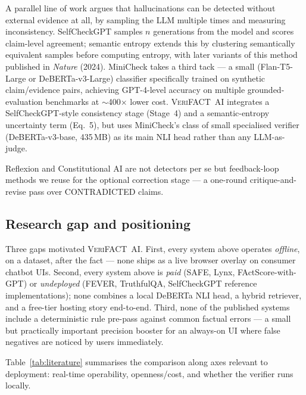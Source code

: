 \documentclass[12pt, a4paper, oneside]{report}
\newcommand{\verifact}{\textsc{VeriFACT~AI}}
\begin{document}
A parallel line of work argues that hallucinations can be detected without external evidence at all, by sampling the LLM multiple times and measuring inconsistency. SelfCheckGPT \cite{manakul2023selfcheck} samples $n$ generations from the model and scores claim-level agreement; semantic entropy \cite{kuhn2024entropy} extends this by clustering semantically equivalent samples before computing entropy, with later variants of this method published in \emph{Nature} (2024). MiniCheck \cite{tang2024minicheck} takes a third tack --- a small (Flan-T5-Large or DeBERTa-v3-Large) classifier specifically trained on synthetic claim/evidence pairs, achieving GPT-4-level accuracy on multiple grounded-evaluation benchmarks at $\sim$400$\times$ lower cost. \verifact{} integrates a SelfCheckGPT-style consistency stage (Stage~4) and a semantic-entropy uncertainty term (Eq.~5), but uses MiniCheck's class of small specialised verifier (DeBERTa-v3-base, 435\,MB) as its main NLI head rather than any LLM-as-judge.

Reflexion \cite{shinn2023reflexion} and Constitutional AI \cite{bai2022constitutional} are not detectors per se but feedback-loop methods we reuse for the optional correction stage --- a one-round critique-and-revise pass over CONTRADICTED claims.

\subsection{Research gap and positioning}

Three gaps motivated \verifact{}. First, every system above operates \emph{offline}, on a dataset, after the fact --- none ships as a live browser overlay on consumer chatbot UIs. Second, every system above is \emph{paid} (SAFE, Lynx, FActScore-with-GPT) or \emph{undeployed} (FEVER, TruthfulQA, SelfCheckGPT reference implementations); none combines a local DeBERTa NLI head, a hybrid retriever, and a free-tier hosting story end-to-end. Third, none of the published systems include a deterministic rule pre-pass against common factual errors --- a small but practically important precision booster for an always-on UI where false negatives are noticed by users immediately.

Table~\ref{tab:literature} summarises the comparison along axes relevant to deployment: real-time operability, openness/cost, and whether the verifier runs locally.
\end{document}
